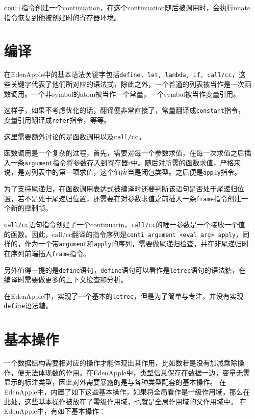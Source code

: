 \texttt{conti}指令创建一个continuation，在这个continuation随后被调用时，会执行nuate指令恢复到他被创建时的寄存器环境。

\section{编译}
\label{sec:vm impl:compile}

在EdenApple中的基本语法关键字包括\texttt{define, let, lambda, if, call/cc}，这些关键字代表了他们所对应的语法式，除此之外，一个普通的列表被当作是一次函数调用。一个非symbol的atom被当作一个常量，一个symbol被当作变量引用。

这样子，如果不考虑优化的话，翻译便非常直接了，常量翻译成\texttt{constant}指令，变量引用翻译成\texttt{refer}指令，等等。

这里需要额外讨论的是函数调用以及\texttt{call/cc}。

函数调用是一个复杂的过程，首先，需要对每一个参数求值，在每一次求值之后插入一条\texttt{argument}指令将参数存入到寄存器r中。随后对所需的函数求值，严格来说，是对列表中的第一项求值，这个值应当是闭包类型。之后便是\texttt{apply}指令。

为了支持尾递归，在函数调用表达式被编译时还要判断该语句是否处于尾递归位置，若不是处于尾递归位置，还需要在对参数求值之前插入一条\texttt{frame}指令创建一个新的控制帧。

\texttt{call/cc}语句指令创建了一个continuatin，\texttt{call/cc}的唯一参数是一个接收一个值的函数。因此，call/cc翻译的指令序列是\texttt{conti argument <eval arg> apply}，同样的，作为一个带\texttt{argument}和\texttt{apply}的序列，需要做尾递归检查，并在非尾递归时在序列前端插入\texttt{frame}指令。

另外值得一提的是\texttt{define}语句，\texttt{define}语句可以看作是\texttt{letrec}语句的语法糖，在编译时需要做更多的上下文检查和分析。

在EdenApple中，实现了一个基本的\texttt{letrec}，但是为了简单与专注，并没有实现\texttt{define}语法糖。

\section{基本操作}

一个数据结构需要相对应的操作才能体现出其作用，比如数若是没有加减乘除操作，便无法体现数的作用。在EdenApple中，类型信息保存在数据一边，变量无需显示的标注类型，因此对外需要暴露的是与各种类型配套的基本操作。
在EdenApple中，内置了如下这些基本操作，如果将全局看作是一级作用域，那么在此处，这些基本操作被放在了零级作用域，也就是全局作用域的父作用域中。
在EdenApple中，有如下基本操作：

